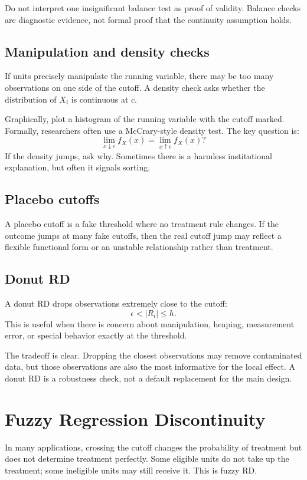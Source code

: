 Do not interpret one insignificant balance test as proof of validity. Balance checks are diagnostic evidence, not formal proof that the continuity assumption holds.

\subsection{Manipulation and density checks}

If units precisely manipulate the running variable, there may be too many observations on one side of the cutoff. A density check asks whether the distribution of $X_i$ is continuous at $c$.

Graphically, plot a histogram of the running variable with the cutoff marked. Formally, researchers often use a McCrary-style density test. The key question is:
\[
    \lim_{x \downarrow c} f_X(x)
    =
    \lim_{x \uparrow c} f_X(x)?
\]
If the density jumps, ask why. Sometimes there is a harmless institutional explanation, but often it signals sorting.

\subsection{Placebo cutoffs}

A placebo cutoff is a fake threshold where no treatment rule changes. If the outcome jumps at many fake cutoffs, then the real cutoff jump may reflect a flexible functional form or an unstable relationship rather than treatment.

\subsection{Donut RD}

A donut RD drops observations extremely close to the cutoff:
\[
    \epsilon < |R_i| \leq h.
\]
This is useful when there is concern about manipulation, heaping, measurement error, or special behavior exactly at the threshold.

The tradeoff is clear. Dropping the closest observations may remove contaminated data, but those observations are also the most informative for the local effect. A donut RD is a robustness check, not a default replacement for the main design.

\section{Fuzzy Regression Discontinuity}

In many applications, crossing the cutoff changes the probability of treatment but does not determine treatment perfectly. Some eligible units do not take up the treatment; some ineligible units may still receive it. This is fuzzy RD.

